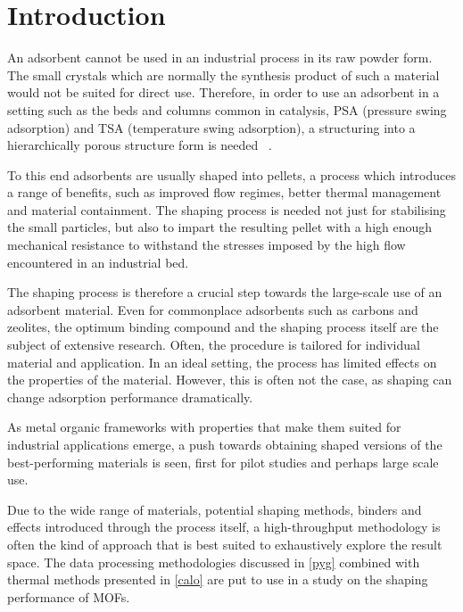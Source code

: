 
\section{Introduction}

An adsorbent cannot be used in an industrial process in its raw powder
form. The small crystals which are normally the synthesis product of
such a material would not be suited for direct use. 
Therefore, in order to use an adsorbent in a setting such 
as the beds and columns common in catalysis, PSA (pressure swing 
adsorption) and TSA (temperature swing adsorption), a structuring 
into a hierarchically porous structure form is needed
~\cite{akhtarStructuringAdsorbentsCatalysts2014}.

To this end adsorbents are usually shaped into pellets, a process
which introduces a range of benefits, such as improved flow regimes,
better thermal management and material containment. The shaping process
is needed not just for stabilising the small particles, but also to
impart the resulting pellet with a high enough mechanical resistance 
to withstand the stresses imposed by the high flow encountered in 
an industrial bed.

The shaping process is therefore a crucial step towards the large-scale
use of an adsorbent material. Even for commonplace adsorbents such as
carbons and zeolites, the optimum binding compound and the shaping
process itself are the subject of extensive research. Often, the
procedure is tailored for individual material and application.
In an ideal setting, the process has limited effects on the properties
of the material. However, this is often not the case, as shaping can 
change adsorption performance dramatically.

As metal organic frameworks with properties that make them suited 
for industrial applications emerge, a push towards obtaining shaped
versions of the best-performing materials is seen, first for 
pilot studies and perhaps large scale use.

Due to the wide range of materials, potential shaping methods, binders 
and effects introduced through the process itself, a high-throughput
methodology is often the kind of approach that is best suited to 
exhaustively explore the result space. The data processing methodologies
discussed in \autoref{pyg} combined with thermal methods
presented in \autoref{calo} are put to use in a study on the 
shaping performance of MOFs.

